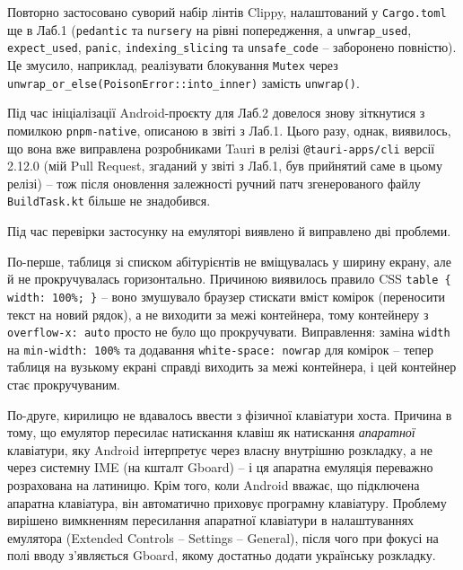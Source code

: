 \documentclass[14pt, a4paper]{extreport}
\begin{document}

	Повторно застосовано суворий набір лінтів Clippy, налаштований у \texttt{Cargo.toml} ще в Лаб.1 (\texttt{pedantic} та \texttt{nursery} на рівні попередження, а \texttt{unwrap\_used}, \texttt{expect\_used}, \texttt{panic}, \texttt{indexing\_slicing} та \texttt{unsafe\_code} -- заборонено повністю). Це змусило, наприклад, реалізувати блокування \texttt{Mutex} через \texttt{unwrap\_or\_else(PoisonError::into\_inner)} замість \texttt{unwrap()}.

	Під час ініціалізації Android-проєкту для Лаб.2 довелося знову зіткнутися з помилкою \texttt{pnpm-native}, описаною в звіті з Лаб.1. Цього разу, однак, виявилось, що вона вже виправлена розробниками Tauri в релізі \texttt{@tauri-apps/cli} версії 2.12.0 (мій Pull Request, згаданий у звіті з Лаб.1, був прийнятий саме в цьому релізі) -- тож після оновлення залежності ручний патч згенерованого файлу \texttt{BuildTask.kt} більше не знадобився.


	Під час перевірки застосунку на емуляторі виявлено й виправлено дві проблеми.

	По-перше, таблиця зі списком абітурієнтів не вміщувалась у ширину екрану, але й не прокручувалась горизонтально. Причиною виявилось правило CSS \texttt{table \{ width: 100\%; \}} -- воно змушувало браузер стискати вміст комірок (переносити текст на новий рядок), а не виходити за межі контейнера, тому контейнеру з \texttt{overflow-x: auto} просто не було що прокручувати. Виправлення: заміна \texttt{width} на \texttt{min-width: 100\%} та додавання \texttt{white-space: nowrap} для комірок -- тепер таблиця на вузькому екрані справді виходить за межі контейнера, і цей контейнер стає прокручуваним.
	

	По-друге, кирилицю не вдавалось ввести з фізичної клавіатури хоста. Причина в тому, що емулятор пересилає натискання клавіш як натискання \textit{апаратної} клавіатури, яку Android інтерпретує через власну внутрішню розкладку, а не через системну IME (на кшталт Gboard) -- і ця апаратна емуляція переважно розрахована на латиницю. Крім того, коли Android вважає, що підключена апаратна клавіатура, він автоматично приховує програмну клавіатуру. Проблему вирішено вимкненням пересилання апаратної клавіатури в налаштуваннях емулятора (Extended Controls -- Settings -- General), після чого при фокусі на полі вводу з'являється Gboard, якому достатньо додати українську розкладку.
	
\end{document}

